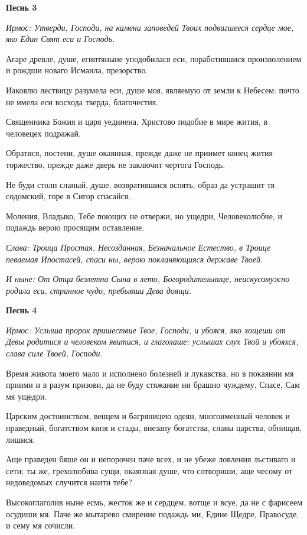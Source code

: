 \medskip


\bfseries Песнь 3\normalfont{}

\itshape Ирмос\normalfont{}: Утверди, Господи, на камени заповедей Твоих подвигшееся сердце мое, яко Един Свят еси и Господь. 

Агаре древле, душе, египтяныне уподобилася еси, поработившися произволением и рождши новаго Исмаила, презорство. 

Иаковлю лествицу разумела еси, душе моя, являемую от земли к Небесем: почто не имела еси восхода тверда, благочестия. 

Священника Божия и царя уединена, Христово подобие в мире жития, в человецех подражай. 

Обратися, постени, душе окаянная, прежде даже не приимет конец жития торжество, прежде даже дверь не заключит чертога Господь. 

Не буди столп сланый, душе, возвратившися вспять, образ да устрашит тя содомский, горе в Сигор спасайся. 

Моления, Владыко, Тебе поющих не отвержи, но ущедри, Человеколюбче, и подаждь верою просящим оставление. 

\itshape Слава\normalfont{}: Троица Простая, Несозданная, Безначальное Естество, в Троице певаемая Ипостасей, спаси ны, верою покланяющияся державе Твоей. 

\itshape И ныне\normalfont{}: От Отца безлетна Сына в лето, Богородительнице, неискусомужно родила еси, странное чудо, пребывши Дева доящи.


\medskip


\bfseries Песнь 4\normalfont{}

\itshape Ирмос\normalfont{}: Услыша пророк пришествие Твое, Господи, и убояся, яко хощеши от Девы родитися и человеком явитися, и глаголаше: услышах слух Твой и убояхся, слава силе Твоей, Господи. 

Время живота моего мало и исполнено болезней и лукавства, но в покаянии мя приими и в разум призови, да не буду стяжание ни брашно чуждему, Спасе, Сам мя ущедри. 

Царским достоинством, венцем и багряницею одеян, многоименный человек и праведный, богатством кипя и стады, внезапу богатства, славы царства, обнищав, лишися. 

Аще праведен бяше он и непорочен паче всех, и не убеже ловления льстиваго и сети; ты же, грехолюбива сущи, окаянная душе, что сотвориши, аще чесому от недоведомых случится наити тебе? 

Высокоглаголив ныне есмь, жесток же и сердцем, вотще и всуе, да не с фарисеем осудиши мя. Паче же мытарево смирение подаждь ми, Едине Щедре, Правосуде, и сему мя сочисли. 

